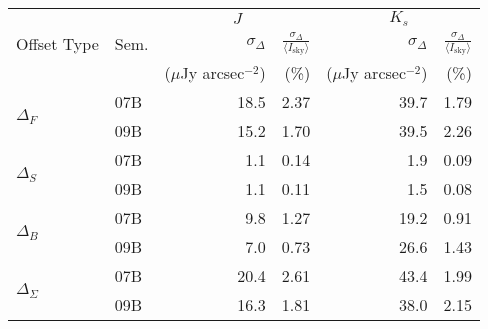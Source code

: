 \begin{tabular}{ll|rr|rr}
&  & \multicolumn{2}{c|}{$J$} & \multicolumn{2}{c}{$K_s$} \\ %
Offset Type & Sem. & $\sigma_\Delta$ & $\frac{\sigma_\Delta}{\langle I_\mathrm{sky}\rangle }$ & $\sigma_\Delta$ & $\frac{\sigma_\Delta}{\langle I_\mathrm{sky}\rangle }$ \\
& & \tiny{($\mu$Jy arcsec$^{-2}$)} &  \tiny{(\%)} & \tiny{($\mu$Jy arcsec$^{-2}$)} &  \tiny{(\%)} \\
\hline
\multirow{2}{*}{$\Delta_F$} & 07B & 18.5 & 2.37 & 39.7 & 1.79 \\
& 09B  & 15.2 & 1.70 & 39.5 & 2.26 \\
\hline
\multirow{2}{*}{$\Delta_S$} & 07B & 1.1 & 0.14 & 1.9 & 0.09 \\
& 09B & 1.1 & 0.11 & 1.5 & 0.08 \\
\hline
\multirow{2}{*}{$\Delta_B$} & 07B & 9.8 & 1.27 & 19.2 & 0.91 \\
& 09B &  7.0 & 0.73 & 26.6 & 1.43 \\
\hline
\multirow{2}{*}{$\Delta_\Sigma$} & 07B &  20.4 & 2.61 & 43.4 & 1.99 \\
& 09B &  16.3 & 1.81 & 38.0 & 2.15 \\
\end{tabular}